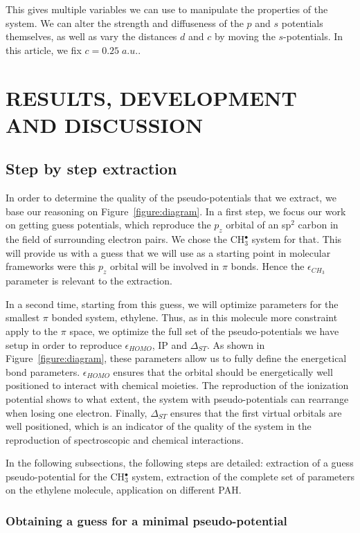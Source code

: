 \documentclass[12pt]{article}
\begin{document}
This gives multiple variables we can use to manipulate the properties of the system.
We can alter the strength and diffuseness of the \(p\) and \(s\) potentials themselves,
as well as vary the distances \(d\) and \(c\) by moving the \(s\)-potentials.
In this article, we fix \(c = 0.25\;a.u.\).

\section*{\sffamily \Large RESULTS, DEVELOPMENT AND DISCUSSION}
\subsection*{\sffamily \large Step by step extraction}
In order to determine the quality of the pseudo-potentials that we extract, we base our
reasoning on Figure~\ref{figure:diagram}.
In a first step, we focus our work on getting guess potentials, which reproduce the
$p_z$ orbital of an sp$^2$ carbon in the field of surrounding electron pairs.
We chose the CH$_3^\bullet$ system for that.
This will provide us with a guess that we will use as a starting point in
molecular frameworks were this $p_z$ orbital will be involved in $\pi$ bonds.
Hence the $\epsilon_{CH_3}$ parameter is relevant to the extraction.

In a second time, starting from this guess, we will optimize parameters for the smallest $\pi$
bonded system, ethylene.
Thus, as in this molecule more constraint apply to the $\pi$ space, we optimize
the full set of the pseudo-potentials we have setup in order to reproduce
$\epsilon_{HOMO}$, IP and $\Delta_{ST}$.
As shown in Figure~\ref{figure:diagram}, these parameters allow us to fully define the energetical
bond parameters.
$\epsilon_{HOMO}$ ensures that the orbital should be energetically well positioned to interact
with chemical moieties.
The reproduction of the ionization potential shows to what extent, the system with pseudo-potentials
can rearrange when losing one electron.
Finally, $\Delta_{ST}$ ensures that the first virtual orbitals are well positioned, which is an
indicator of the quality of the system in the reproduction of spectroscopic and chemical interactions.

In the following subsections, the following steps are detailed: extraction of a guess pseudo-potential
for the CH$_3^\bullet$ system, extraction of the complete set of parameters on the ethylene molecule,
application on different PAH.

\subsubsection*{\sffamily \large Obtaining a guess for a minimal pseudo-potential}
\end{document}
